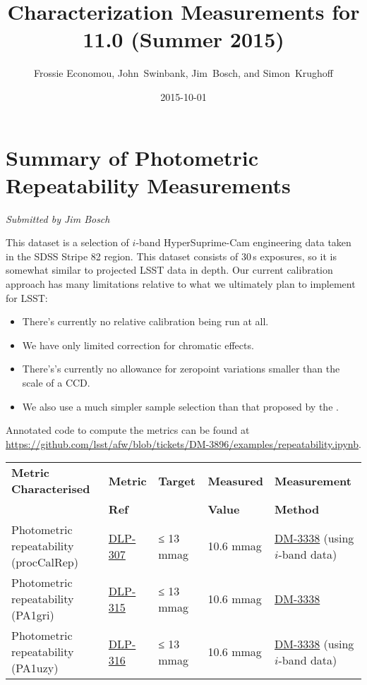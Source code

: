 \documentclass[DM,toc,lsstdraft]{lsstdoc}
\title[v11.0 Characterization]{Characterization Measurements for 11.0 (Summer 2015)}
\author{Frossie Economou, John~Swinbank, Jim~Bosch, and Simon~Krughoff}
\date{2015-10-01}
\begin{document}
\maketitle

\section{Summary of Photometric Repeatability
Measurements}\label{summary-of-photometric-repeatability-measurements}

\emph{Submitted by Jim Bosch}

This dataset is a selection of $i$-band HyperSuprime-Cam engineering data
taken in the SDSS Stripe 82 region. This dataset consists of 30\,s
exposures, so it is somewhat similar to projected LSST data in depth.
Our current calibration approach has many limitations relative to what
we ultimately plan to implement for LSST:

\begin{itemize}
\item
  There's currently no relative calibration being run at all.
\item
  We have only limited correction for chromatic effects.
\item
  There's's currently no allowance for zeropoint variations smaller than
  the scale of a CCD.
\item
  We also use a much simpler sample selection than that proposed by the
  \SRD.
\end{itemize}

Annotated code to compute the metrics can be found at
\url{https://github.com/lsst/afw/blob/tickets/DM-3896/examples/repeatability.ipynb}.

\begin{small}
\begin{longtable}[]{@{}lllll@{}}
\toprule
\textbf{Metric Characterised} & \textbf{Metric} & \textbf{Target} &
\textbf{Measured} & \textbf{Measurement}\tabularnewline
 & \textbf{Ref} &  &
\textbf{Value} & \textbf{Method}\tabularnewline
\midrule
\endhead
Photometric repeatability (procCalRep) &
\href{https://jira.lsstcorp.org/browser/DLP-307}{DLP-307} & ≤ 13 mmag &
10.6 mmag & \href{https://jira.lsstcorp.org/browse/DM-3338}{DM-3338}
(using $i$-band data)\tabularnewline
Photometric repeatability (PA1gri) &
\href{https://jira.lsstcorp.org/browse/DLP-315}{DLP-315} & ≤ 13 mmag &
10.6 mmag &
\href{https://jira.lsstcorp.org/browse/DM-3338}{DM-3338}\tabularnewline
Photometric repeatability (PA1uzy) &
\href{https://jira.lsstcorp.org/browse/DLP-316}{DLP-316} & ≤ 13 mmag &
10.6 mmag & \href{https://jira.lsstcorp.org/browse/DM-3338}{DM-3338}
(using $i$-band data)\tabularnewline
\bottomrule
\end{longtable}
\end{small}
\end{document}
